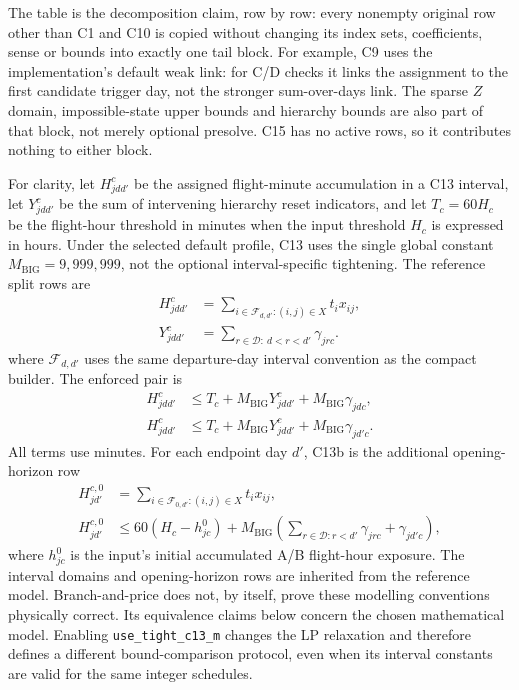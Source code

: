 The table is the decomposition claim, row by row: every nonempty original
row other than C1 and C10 is copied without changing its index sets,
coefficients, sense or bounds into exactly one tail block. For example, C9
uses the implementation's default weak link: for C/D checks it links the
assignment to the first candidate trigger day, not the stronger sum-over-days
link. The sparse $Z$ domain, impossible-state upper bounds and hierarchy bounds
are also part of that block, not merely optional presolve. C15 has no active
rows, so it contributes nothing to either block.

For clarity, let $H_{jdd'}^c$ be the assigned flight-minute accumulation
in a C13 interval, let $Y_{jdd'}^c$ be the sum of intervening hierarchy reset
indicators, and let $T_c=60H_c$ be the flight-hour threshold in minutes when
the input threshold $H_c$ is expressed in hours. Under the selected default
profile, C13 uses the single global constant $M_{\mathrm{BIG}}=9{,}999{,}999$,
not the optional interval-specific tightening. The reference split rows are
\begin{align}
 H_{jdd'}^c&=\sum_{i\in\mathcal F_{d,d'}:(i,j)\in X}t_i x_{ij},\\
 Y_{jdd'}^c&=\sum_{r\in\mathcal D:\ d<r<d'}\gamma_{jrc}.
 \label{eq:bp_c13_accumulation}
\end{align}
where $\mathcal F_{d,d'}$ uses the same departure-day interval convention as
the compact builder. The enforced pair is
\begin{align}
 H_{jdd'}^c &\le T_c+M_{\mathrm{BIG}}Y_{jdd'}^c
                         +M_{\mathrm{BIG}}\gamma_{jdc},\\
 H_{jdd'}^c &\le T_c+M_{\mathrm{BIG}}Y_{jdd'}^c
                         +M_{\mathrm{BIG}}\gamma_{jd'c}.
 \label{eq:bp_retained_c13}
\end{align}
All terms use minutes. For each endpoint day $d'$, C13b is the additional
opening-horizon row
\begin{align}
 H_{jd'}^{c,0}&=\sum_{i\in\mathcal F_{0,d'}:(i,j)\in X}t_i x_{ij},\\
 H_{jd'}^{c,0}&\le 60(H_c-h_{jc}^{0})+
 M_{\mathrm{BIG}}\left(\sum_{r\in\mathcal D:r<d'}\gamma_{jrc}
                        +\gamma_{jd'c}\right),
 \label{eq:bp_c13b}
\end{align}
where $h_{jc}^{0}$ is the input's initial accumulated A/B flight-hour
exposure. The interval domains and opening-horizon rows are inherited from
the reference model. Branch-and-price does not, by
itself, prove these modelling conventions physically correct. Its equivalence
claims below concern the chosen mathematical model. Enabling
\texttt{use\_tight\_c13\_m} changes the LP relaxation and therefore defines a
different bound-comparison protocol, even when its interval constants are
valid for the same integer schedules.

